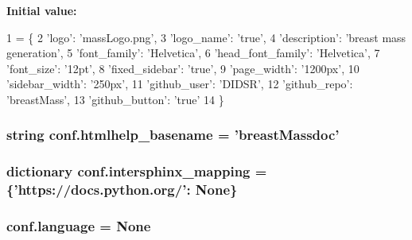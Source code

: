 {\bfseries Initial value\-:}
\begin{DoxyCode}
1 = \{
2     \textcolor{stringliteral}{'logo'}: \textcolor{stringliteral}{'massLogo.png'},
3     \textcolor{stringliteral}{'logo\_name'}: \textcolor{stringliteral}{'true'},
4     \textcolor{stringliteral}{'description'}: \textcolor{stringliteral}{'breast mass generation'},
5     \textcolor{stringliteral}{'font\_family'}: \textcolor{stringliteral}{'Helvetica'},
6     \textcolor{stringliteral}{'head\_font\_family'}: \textcolor{stringliteral}{'Helvetica'},
7     \textcolor{stringliteral}{'font\_size'}: \textcolor{stringliteral}{'12pt'},
8     \textcolor{stringliteral}{'fixed\_sidebar'}: \textcolor{stringliteral}{'true'},
9     \textcolor{stringliteral}{'page\_width'}: \textcolor{stringliteral}{'1200px'},
10     \textcolor{stringliteral}{'sidebar\_width'}: \textcolor{stringliteral}{'250px'},
11     \textcolor{stringliteral}{'github\_user'}: \textcolor{stringliteral}{'DIDSR'},
12     \textcolor{stringliteral}{'github\_repo'}: \textcolor{stringliteral}{'breastMass'},
13     \textcolor{stringliteral}{'github\_button'}: \textcolor{stringliteral}{'true'}
14 \}
\end{DoxyCode}
\hypertarget{namespaceconf_aab7fddb2766ce3c430d8246fbfdbc7b1}{
\subsubsection[{htmlhelp\-\_\-basename}]{\setlength{\rightskip}{0pt plus 5cm}string conf.\-htmlhelp\-\_\-basename = 'breast\-Massdoc'}}\label{namespaceconf_aab7fddb2766ce3c430d8246fbfdbc7b1}
\hypertarget{namespaceconf_a8375f4f963de3ac8026eaa9beced9564}{
\subsubsection[{intersphinx\-\_\-mapping}]{\setlength{\rightskip}{0pt plus 5cm}dictionary conf.\-intersphinx\-\_\-mapping = \{'https\-://docs.\-python.\-org/'\-: None\}}}\label{namespaceconf_a8375f4f963de3ac8026eaa9beced9564}
\hypertarget{namespaceconf_ad76a2e6d7bfa880ebb4042c08e8b4e12}{
\subsubsection[{language}]{\setlength{\rightskip}{0pt plus 5cm}conf.\-language = None}}\label{namespaceconf_ad76a2e6d7bfa880ebb4042c08e8b4e12}
